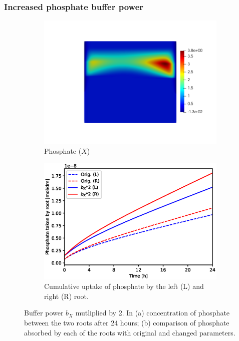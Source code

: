 \documentclass[11pt]{article}
\numberwithin{equation}{section}
\begin{document}
\FloatBarrier
\subsubsection{Increased phosphate buffer power}
\begin{figure}[!htb]
\centering
\begin{subfigure}[t]{0.45\textwidth}
    \includegraphics[trim= 100 100 60 100,width=\textwidth]{Figures/X_bXtimes2.png}
    \caption{Phosphate ($X$)}
\end{subfigure}
\qquad
\begin{subfigure}[t]{0.45\textwidth}
    \includegraphics[width=\textwidth]{Figures/bxtimes2.eps}
    \caption{Cumulative uptake of phosphate by the left (L) and right (R) root.}
\end{subfigure}

\caption{Buffer power $b_X$ mutliplied by 2. In (a) concentration of phosphate between the two roots after 24 hours; (b) comparison of phosphate absorbed by each of the roots with original and changed parameters.}
\end{figure}
\end{document}

